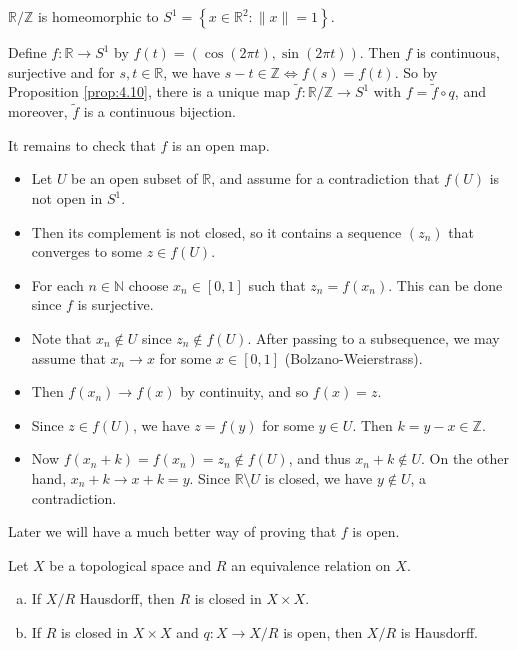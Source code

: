 \documentclass[a4paper,11pt]{article}
\begin{document}
\begin{example}
    $\mathbb{R} / \mathbb{Z}$ is homeomorphic to $S^{1}=\left\{x \in \mathbb{R}^{2}:\|x\|=1\right\}$.

    Define $f: \mathbb{R} \rightarrow S^{1}$ by $f(t)=(\cos (2 \pi t), \sin (2 \pi t))$. Then $f$ is continuous, surjective and for $s, t \in \mathbb{R}$, we have $s-t \in \mathbb{Z} \Longleftrightarrow f(s)=f(t)$. So by Proposition \ref{prop:4.10}, there is a unique map $\tilde{f}: \mathbb{R} / \mathbb{Z} \rightarrow S^{1}$ with $f=\tilde{f} \circ q$, and moreover, $\tilde{f}$ is a continuous bijection.

    It remains to check that $f$ is an open map. 
    \begin{itemize}
        \item Let $U$ be an open subset of $\mathbb{R}$, and assume for a contradiction that $f(U)$ is not open in $S^{1}$. 
        \item Then its complement is not closed, so it contains a sequence $\left(z_{n}\right)$ that converges to some $z \in f(U)$. 
        \item For each $n \in \mathbb{N}$ choose $x_{n} \in[0,1]$ such that $z_{n}=f\left(x_{n}\right)$. This can be done since $f$ is surjective.  
        \item Note that $x_{n} \notin U$ since $z_{n} \notin f(U)$. After passing to a subsequence, we may assume that $x_{n} \rightarrow x$ for some $x \in[0,1]$ (Bolzano-Weierstrass). 
        \item Then $f\left(x_{n}\right) \rightarrow f(x)$ by continuity, and so $f(x)=z$. 
        \item Since $z \in f(U)$, we have $z=f(y)$ for some $y \in U$. Then $k=y-x \in \mathbb{Z}$. 
        \item Now $f\left(x_{n}+k\right)=f\left(x_{n}\right)=z_{n} \notin f(U)$, and thus $x_{n}+k \notin U$. On the other hand, $x_{n}+k \rightarrow x+k=y$. Since $\mathbb{R} \setminus U$ is closed, we have $y \notin U$, a contradiction.
    \end{itemize}

    Later we will have a much better way of proving that $f$ is open.
\end{example}

\begin{proposition}
    Let $X$ be a topological space and $R$ an equivalence relation on $X$.
    \begin{enumerate}[(a)]
        \item If $X / R$ Hausdorff, then $R$ is closed in $X \times X$.
        \item If $R$ is closed in $X \times X$ and $q: X \rightarrow X / R$ is open, then $X / R$ is Hausdorff.
    \end{enumerate}
\end{proposition}
\end{document}
